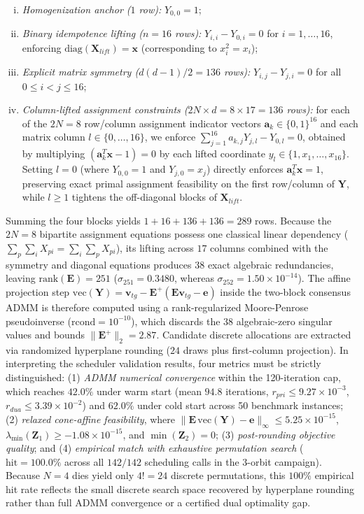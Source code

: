 \documentclass[a4paper,fleqn]{cas-dc}
\begin{document}
\begin{enumerate}[(i)]
\item \textit{Homogenization anchor ($1$ row):} $Y_{0,0} = 1$;
\item \textit{Binary idempotence lifting ($n = 16$ rows):} $Y_{i,i} - Y_{0,i} = 0$ for $i = 1,\dots,16$, enforcing $\mathrm{diag}(\mathbf{X}_{lift}) = \mathbf{x}$ (corresponding to $x_i^2 = x_i$);
\item \textit{Explicit matrix symmetry ($d(d-1)/2 = 136$ rows):} $Y_{i,j} - Y_{j,i} = 0$ for all $0 \le i < j \le 16$;
\item \textit{Column-lifted assignment constraints ($2N \times d = 8 \times 17 = 136$ rows):} for each of the $2N = 8$ row/column assignment indicator vectors $\mathbf{a}_k \in \{0,1\}^{16}$ and each matrix column $l \in \{0,\dots,16\}$, we enforce $\sum_{j=1}^{16} a_{k,j} Y_{j,l} - Y_{0,l} = 0$, obtained by multiplying $(\mathbf{a}_k^T \mathbf{x} - 1) = 0$ by each lifted coordinate $y_l \in \{1, x_1, \dots, x_{16}\}$. Setting $l = 0$ (where $Y_{0,0}=1$ and $Y_{j,0}=x_j$) directly enforces $\mathbf{a}_k^T \mathbf{x} = 1$, preserving exact primal assignment feasibility on the first row/column of $\mathbf{Y}$, while $l \ge 1$ tightens the off-diagonal blocks of $\mathbf{X}_{lift}$.
\end{enumerate}
Summing the four blocks yields $1 + 16 + 136 + 136 = 289$ rows. Because the $2N = 8$ bipartite assignment equations possess one classical linear dependency ($\sum_p \sum_i X_{pi} = \sum_i \sum_p X_{pi}$), its lifting across $17$ columns combined with the symmetry and diagonal equations produces $38$ exact algebraic redundancies, leaving $\mathrm{rank}(\mathbf{E}) = 251$ ($\sigma_{251} = 0.3480$, whereas $\sigma_{252} = 1.50\times 10^{-14}$). The affine projection step $\mathrm{vec}(\mathbf{Y}) = \mathbf{v}_{tg} - \mathbf{E}^+(\mathbf{E}\mathbf{v}_{tg} - \mathbf{e})$ inside the two-block consensus ADMM is therefore computed using a rank-regularized Moore-Penrose pseudoinverse ($\mathrm{rcond}=10^{-10}$), which discards the 38 algebraic-zero singular values and bounds $\|\mathbf{E}^+\|_2 = 2.87$. Candidate discrete allocations are extracted via randomized hyperplane rounding ($24$ draws plus first-column projection). In interpreting the scheduler validation results, four metrics must be strictly distinguished: (1) \textit{ADMM numerical convergence} within the 120-iteration cap, which reaches $42.0\%$ under warm start (mean $94.8$ iterations, $r_{pri} \le 9.27\times 10^{-3}$, $r_{dua} \le 3.39\times 10^{-2}$) and $62.0\%$ under cold start across 50 benchmark instances; (2) \textit{relaxed cone-affine feasibility}, where $\|\mathbf{E}\,\mathrm{vec}(\mathbf{Y})-\mathbf{e}\|_\infty \le 5.25\times 10^{-15}$, $\lambda_{\min}(\mathbf{Z}_1) \ge -1.08\times 10^{-15}$, and $\min(\mathbf{Z}_2) = 0$; (3) \textit{post-rounding objective quality}; and (4) \textit{empirical match with exhaustive permutation search} ($\mathrm{hit} = 100.0\%$ across all $142/142$ scheduling calls in the 3-orbit campaign). Because $N=4$ dies yield only $4! = 24$ discrete permutations, this $100\%$ empirical hit rate reflects the small discrete search space recovered by hyperplane rounding rather than full ADMM convergence or a certified dual optimality gap.
\end{document}
